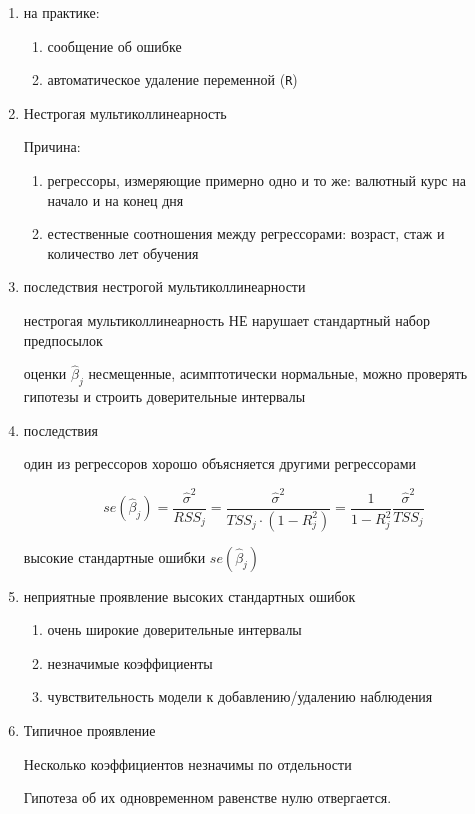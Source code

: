 \documentclass[12pt,a4paper]{article}
\begin{document}
{\begin{enumerate}
\item на практике: 
\begin{enumerate}
\item сообщение об ошибке
\item автоматическое удаление переменной (\verb|R|)
\end{enumerate}

\item Нестрогая мультиколлинеарность

Причина: 

\begin{enumerate}
\item регрессоры, измеряющие примерно одно и то же: валютный курс на начало и на конец дня
\item естественные соотношения между регрессорами: возраст, стаж и количество лет обучения
\end{enumerate}

\item последствия нестрогой мультиколлинеарности

нестрогая мультиколлинеарность НЕ нарушает стандартный набор предпосылок

оценки $\hat{\beta}_j$ несмещенные, асимптотически нормальные, можно проверять гипотезы и строить доверительные интервалы

\item последствия 

один из регрессоров хорошо объясняется другими регрессорами

\[
se(\hat{\beta}_j)=\frac{\hat{\sigma}^2}{RSS_j}=\frac{\hat{\sigma}^2}{TSS_j\cdot (1-R^2_j)}=
\frac{1}{1-R^2_j}\frac{\hat{\sigma}^2}{TSS_j}
\]

высокие стандартные ошибки $se(\hat{\beta}_j)$

\item неприятные проявление высоких стандартных ошибок

\begin{enumerate}
\item очень широкие доверительные интервалы
\item незначимые коэффициенты
\item чувствительность модели к добавлению/удалению наблюдения
\end{enumerate}

\item Типичное проявление

Несколько коэффициентов незначимы по отдельности

Гипотеза об их одновременном равенстве нулю отвергается.


\end{enumerate}}
\end{document}
